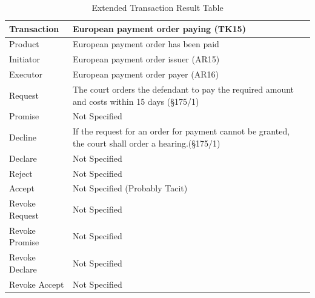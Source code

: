 \begin{landscape}
\begin{table}[h]
\caption{Extended Transaction Result Table}
\label{tab:etrt}
\begin{tabular}{|l||l|l|}
\hline
Transaction  &  European payment order paying (TK15) \\ \hline
Product      &  European payment order has been paid \\ \hline
Initiator      &  European payment order issuer (AR15) \\ \hline
Executor       &  European payment order payer (AR16) \\ \hline
Request        &   The court orders the defendant to pay the required amount and costs within 15 days  (\S175/1)
  \\ \hline
Promise        &    Not Specified   \\ \hline
Decline        &  If the request for an order for payment cannot be granted, the court shall order a hearing.(\S175/1)  \\ \hline
Declare        &  Not Specified  \\ \hline
Reject         &  Not Specified   \\ \hline
Accept         & Not Specified (Probably Tacit) \\ \hline
Revoke Request & Not Specified      \\ \hline
Revoke Promise & Not Specified  \\ \hline
Revoke Declare & Not Specified      \\ \hline
Revoke Accept  &  Not Specified \\ \hline
\end{tabular}
\end{table}


\end{landscape}
